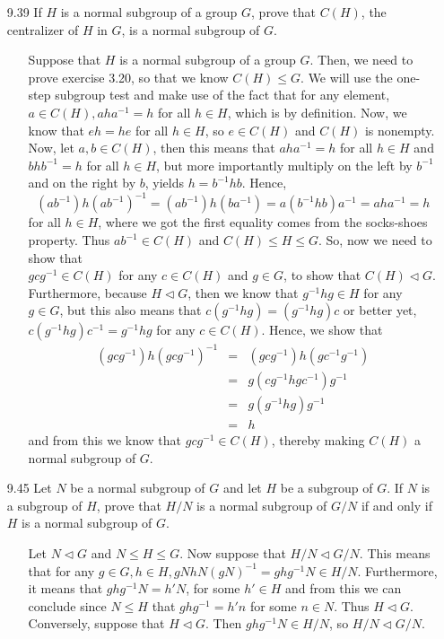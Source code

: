 \documentclass[12pt]{article}
\begin{document}
\begin{enumerate}
\item[9.39] If $H$ is a normal subgroup of a group $G$, prove that $C(H)$, the centralizer
of $H$ in $G$, is a normal subgroup of $G$.
\begin{enumerate}
\item[] Suppose that $H$ is a normal subgroup of a group $G$. Then, we need to prove exercise 3.20, 
so that we know $C(H) \leq G$. We will use the one-step subgroup test and make use of the fact that
for any element, $a \in C(H), aha^{-1} = h$ for all $h \in H$, which is by definition.
Now, we know that $eh = he$ for all $h \in H$, so $e \in C(H)$ and $C(H)$ is nonempty. 
Now, let $a, b \in C(H)$, then this means that $aha^{-1} = h$ for all $h \in H$ and 
$bhb^{-1} = h$ for all $h \in H$, but more importantly multiply on the left by $b^{-1}$ and on the right
by $b$, yields $h = b^{-1}hb$. Hence,
\[
(ab^{-1})h(ab^{-1})^{-1} = (ab^{-1})h(ba^{-1}) = a(b^{-1}hb)a^{-1} = aha^{-1} = h
\]
for all $h \in H$, where we got the first equality comes from the socks-shoes property. Thus
$ab^{-1} \in C(H)$ and $C(H) \leq H \leq G$. So, now we need to show that \\
$gcg^{-1} \in C(H)$ for any $c \in C(H)$ and $g \in G$, to show that $C(H) \lhd G$. 
Furthermore, because $H \lhd G$, then we know that $g^{-1}hg \in H$ for any $g \in G$, but this 
also means that $c(g^{-1}hg) = (g^{-1}hg)c$ or better yet, $c(g^{-1}hg)c^{-1} = g^{-1}hg$ for
any $c \in C(H)$. Hence, we show that
\begin{eqnarray*}
(gcg^{-1})h(gcg^{-1})^{-1} &=& (gcg^{-1})h(gc^{-1}g^{-1}) \\
&=& g(cg^{-1}hgc^{-1})g^{-1} \\
&=& g(g^{-1}hg)g^{-1} \\
&=& h
\end{eqnarray*}
and from this we know that $gcg^{-1} \in C(H)$, thereby making $C(H)$ a normal subgroup of $G$. 
\end{enumerate}

\item[9.45] Let $N$ be a normal subgroup of $G$ and let $H$ be a subgroup of $G$. If $N$ is a
subgroup of $H$, prove that $H/N$ is a normal subgroup of $G/N$ if and only if $H$ is a normal
subgroup of $G$.
\begin{enumerate}
\item[] Let $N \lhd G$ and $N \leq H \leq G$. Now suppose that $H/N \lhd G/N$. This means that
for any $g \in G, h \in H, gNhN(gN)^{-1} = ghg^{-1}N \in H/N$. 
Furthermore, it means that $ghg^{-1}N = h'N$, for some
$h' \in H$ and from this we can conclude since $N \leq H$ that $ghg^{-1} = h'n$ for some $n \in N$.
Thus $H \lhd G$. Conversely, suppose that $H \lhd G$. Then $ghg^{-1}N \in H/N$, so $H/N \lhd G/N$.
\end{enumerate}


\end{enumerate}
\end{document}
